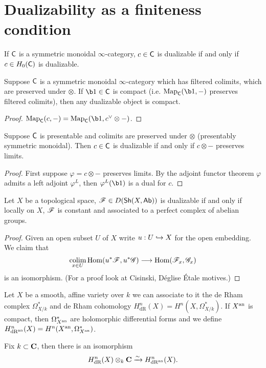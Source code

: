 \section{Dualizability as a finiteness condition}
\begin{definition}
	If $\mathsf{C}$ is a symmetric monoidal $\infty$-category, $c\in \mathsf{C}$ is dualizable if and only
	if $c\in H_0(\mathsf{C})$ is dualizable.
\end{definition}
\begin{lemma}
	Suppose $\mathsf{C}$ is a symmetric monoidal $\infty$-category which has filtered colimits,
	which are preserved under $\otimes$. If $\b1\in \C$ is compact (i.e. $\Map_{\C}(\b1,-)$
	preserves filtered colimits), then any dualizable object is compact.
\end{lemma}
\begin{proof}
	$\Map_{\C}(c,-)=\Map_{\C}(\b1, c^{\vee}\otimes -)$.
\end{proof}
\begin{lemma}
	Suppose $\mathsf{C}$ is presentable and colimits are preserved under $\otimes$ (presentably
	symmetric monoidal). Then $c\in \mathsf{C}$ is dualizable if and only if $c\otimes -$ preserves limits.
\end{lemma}
\begin{proof}
	First suppose $\varphi=c\otimes -$ preserves limits. By the adjoint functor theorem
	$\varphi$ admits a left adjoint $\varphi^{L}$, then $\varphi^{L}(\b1)$ is a dual for $c$.
\end{proof}
\begin{lemma}
	Let $X$ be a topological space, $\mathscr{F}\in D(\mathsf{Sh}(X,\mathsf{Ab}))$ is dualizable if and only if
	locally on $X$, $\mathscr{F}$ is constant and associated to a perfect complex of abelian groups.
\end{lemma}
\begin{proof}
	Given an open subset $U$ of $X$ write $u:U\hookrightarrow X$ for the open embedding. We claim that
	\[
		\colim_{x\in U}\Hom(u^{*}\CF,u^{*}\CG)\to \Hom(\CF_x, \CG_x)
	\]
	is an isomorphism. (For a proof look at Cisinski, D\'eglise \'Etale motives.)
\end{proof}
Let $X$ be a smooth, affine variety over $k$ we can associate to it the de Rham complex
$\Omega_{X /k}^{*}$ and de Rham cohomology $H_{\text{dR}}^{n}(X)=H^{n}(X,\Omega_{X
/k}^{*})$. If $X^\text{an}$ is compact, then $\Omega_{X^\text{an}}^{*}$ are holomorphic differential
forms and we define $H_{\text{dR}^\text{an}}^{n}(X) = H^{n}(X^\text{an},\Omega^{*}_{X^\text{an}})$.
\begin{theorem}
	Fix $k\subset \mathbf{C}$, then there is an isomorphism
	\[
		H_{\text{dR}}^{n}(X)\otimes_k \mathbf{C} \xrightarrow{\sim} H_{\text{dR}^\text{an}}^{n}(X)
	.\] 	
\end{theorem}
